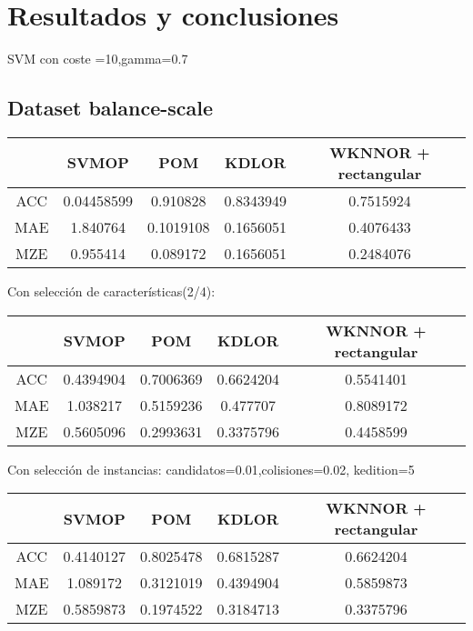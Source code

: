 \chapter{Resultados y conclusiones}
\label{conclusion}

SVM con coste =10,gamma=0.7
\section{Dataset balance-scale}
\begin{tabular}{ c c c c c }
	& SVMOP & POM & KDLOR & WKNNOR + rectangular \\
	\hline	
ACC &	0.04458599 & 0.910828 & 0.8343949 & 0.7515924\\
MAE &	1.840764 & 0.1019108 & 0.1656051 & 0.4076433\\
MZE &	0.955414 & 0.089172 & 0.1656051 & 0.2484076 \\
	\hline  
\end{tabular}

Con selección de características(2/4):

\begin{tabular}{ c c c c c }
	& SVMOP & POM & KDLOR & WKNNOR + rectangular \\
	\hline	
	ACC &	0.4394904 & 0.7006369 & 0.6624204  & 0.5541401 \\
	MAE &	1.038217 & 0.5159236 & 0.477707  & 0.8089172 \\
	MZE &	0.5605096 & 0.2993631 & 0.3375796  & 0.4458599  \\
	\hline  
\end{tabular}

Con selección de instancias:
candidatos=0.01,colisiones=0.02, kedition=5

\begin{tabular}{ c c c c c }
	& SVMOP & POM & KDLOR & WKNNOR + rectangular \\
	\hline	
	ACC &	0.4140127 & 0.8025478 & 0.6815287  & 0.6624204 \\
	MAE &	1.089172 & 0.3121019 & 0.4394904  & 0.5859873 \\
	MZE &	0.5859873 & 0.1974522 & 0.3184713  & 0.3375796  \\
	\hline  
\end{tabular}

